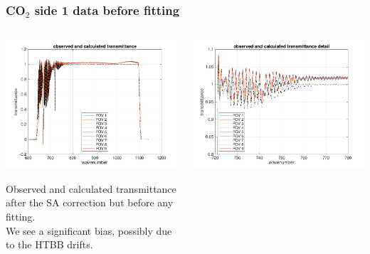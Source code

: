 \documentclass[10pt]{beamer}
\begin{document}
\begin{frame}
\frametitle{CO$_2$ side 1 data before fitting}
\begin{columns}[t]
\begin{column}{0.5\textwidth}  
  \begin{centering}
  \includegraphics[width=\textwidth]{01-12_pfh_s1_CO2/spec_test2_all.png}
  \end{centering}\vspace{3mm}

Observed and calculated transmittance after the SA correction but
before any fitting. \\ We see a significant bias, possibly due to the
HTBB drifts.

\end{column}

\begin{column}{0.5\textwidth}
  \begin{centering}
  \includegraphics[width=\textwidth]{01-12_pfh_s1_CO2/spec_test2_zoom.png}
  \end{centering}\vspace{3mm}


\end{column}
\end{columns}
\end{frame}
\end{document}
